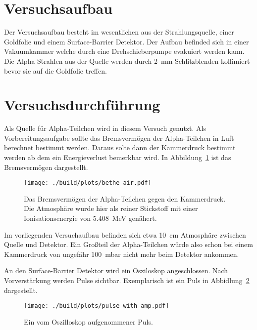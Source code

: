 \section{Versuchsaufbau}

Der Versuchsaufbau besteht im wesentlichen aus der Strahlungsquelle, einer Goldfolie und einem Surface-Barrier Detektor.
Der Aufbau befinded sich in einer Vakuumkammer welche durch eine Drehschieberpumpe evakuiert werden kann.
Die Alpha-Strahlen aus der Quelle werden durch \SI{2}{\mm} Schlitzblenden kollimiert bevor sie auf die Goldfolie treffen.


\section{Versuchsdurchführung}

Als Quelle für Alpha-Teilchen wird in diesem Versuch  genutzt. Als Vorbereitungsaufgabe sollte das Bremsvermögen
der Alpha-Teilchen in Luft berechnet bestimmt werden. Daraus solte dann der Kammerdruck bestimmt werden ab dem  ein Energieverlust
bemerkbar wird. In Abbildung~\ref{fig:bethe} ist das Bremsvermögen dargestellt.

\begin{figure}
  \centering
  \texttt{[image: ./build/plots/bethe\_air.pdf]}
  \caption{Das Bremsvermögen der Alpha-Teilchen gegen den Kammerdruck. Die Atmosphäre wurde hier als reiner Stickstoff mit einer Ionisationsenergie von \SI{5.408}{\MeV} genähert.}
  \label{fig:bethe}
\end{figure}

Im vorliegenden Versuchaufbau befinden sich etwa \SI{10}{\cm} Atmosphäre zwischen Quelle und Detektor. Ein Großteil der Alpha-Teilchen würde also schon bei einem Kammerdruck
von ungefähr \SI{100}{\milli \bar} nicht mehr beim Detektor ankommen.


An den Surface-Barrier Detektor wird ein Osziloskop angeschlossen. Nach Vorverstärkung werden Pulse sichtbar. Exemplarisch ist ein Puls in Abbidlung~\ref{fig:pulse} dargestellt.


\begin{figure}
  \centering
  \texttt{[image: ./build/plots/pulse\_with\_amp.pdf]}
  \caption{Ein vom Oszilloskop aufgenommener Puls.}
  \label{fig:pulse}
\end{figure}
